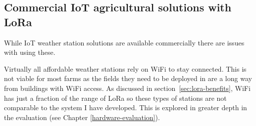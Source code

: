 \subsection{Commercial IoT agricultural solutions with LoRa}

While IoT weather station solutions are available commercially there are issues
with using these.

Virtually all affordable weather stations rely on WiFi to stay connected. This
is not viable for most farms as the fields they need to be deployed in are a
long way from buildings with WiFi access. As discussed in
section~\ref{sec:lora-benefits}, WiFi has just a fraction of the range of LoRa
so these types of stations are not comparable to the system I have developed.
This is explored in greater depth in the evaluation (see Chapter
\ref{hardware-evaluation}).
